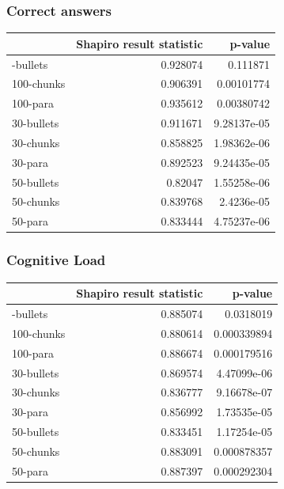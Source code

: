 \documentclass[
  letterpaper,
  DIV=11,
  numbers=noendperiod]{scrartcl}
\newcounter{none} %
\begin{document}
\subsubsection{Correct answers}\label{correct-answers}

{\def\LTcaptype{none} %
\begin{longtable}[]{@{}lrr@{}}
\toprule\noalign{}
& Shapiro result statistic & p-value \\
\midrule\noalign{}
\endhead
\bottomrule\noalign{}
\endlastfoot
100-bullets & 0.928074 & 0.111871 \\
100-chunks & 0.906391 & 0.00101774 \\
100-para & 0.935612 & 0.00380742 \\
30-bullets & 0.911671 & 9.28137e-05 \\
30-chunks & 0.858825 & 1.98362e-06 \\
30-para & 0.892523 & 9.24435e-05 \\
50-bullets & 0.82047 & 1.55258e-06 \\
50-chunks & 0.839768 & 2.4236e-05 \\
50-para & 0.833444 & 4.75237e-06 \\
\end{longtable}
}

\subsubsection{Cognitive Load}\label{cognitive-load}

{\def\LTcaptype{none} %
\begin{longtable}[]{@{}lrr@{}}
\toprule\noalign{}
& Shapiro result statistic & p-value \\
\midrule\noalign{}
\endhead
\bottomrule\noalign{}
\endlastfoot
100-bullets & 0.885074 & 0.0318019 \\
100-chunks & 0.880614 & 0.000339894 \\
100-para & 0.886674 & 0.000179516 \\
30-bullets & 0.869574 & 4.47099e-06 \\
30-chunks & 0.836777 & 9.16678e-07 \\
30-para & 0.856992 & 1.73535e-05 \\
50-bullets & 0.833451 & 1.17254e-05 \\
50-chunks & 0.883091 & 0.000878357 \\
50-para & 0.887397 & 0.000292304 \\
\end{longtable}
}
\end{document}
